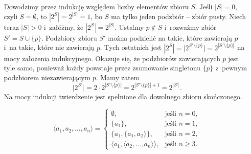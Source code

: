 \exercise %
Dowodzimy przez indukcję względem liczby elementów zbioru $S$.
Jeśli $|S|=0$, czyli $S=\emptyset$, to $|2^S|=2^{|S|}=1$, bo $S$ ma tylko jeden podzbiór -- zbiór pusty.
Niech teraz $|S|>0$ i~załóżmy, że $|2^S|=2^{|S|}$.
Ustalmy $p\notin S$ i~rozważmy zbiór $S'=S\cup\{p\}$.
Podzbiory zbioru $S'$ można podzielić na takie, które zawierają $p$ i~na takie, które nie zawierają $p$.
Tych ostatnich jest $|2^S|=\bigl|2^{S'\setminus\{p\}}\bigr|=2^{|S'\setminus\{p\}|}$ na mocy założenia indukcyjnego.
Okazuje się, że podzbiorów zawierających $p$ jest tyle samo, ponieważ każdy powstaje przez zsumowanie singletonu $\{p\}$ z~pewnym podzbiorem niezawierającym $p$.
Mamy zatem
\[
	\bigl|2^{S'}\bigr|=2\cdot2^{|S'\setminus\{p\}|} = 2^{|S'\setminus\{p\}|+1} = 2^{|S'|}.
\]
Na mocy indukcji twierdzenie jest spełnione dla dowolnego zbioru skończonego.

\exercise %
\[
	\langle a_1,a_2,\dots,a_n\rangle =
	\begin{cases}
		\emptyset, & \text{jeśli $n=0$}, \\
		\{a_1\}, & \text{jeśli $n=1$}, \\
		\{a_1,\{a_1,a_2\}\}, & \text{jeśli $n=2$}, \\
		\langle a_1,\langle a_2,\dots,a_n\rangle\rangle, & \text{jeśli $n\ge3$}.
	\end{cases}
\]

